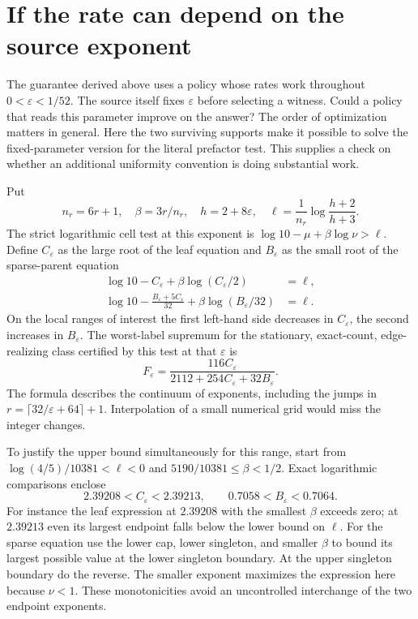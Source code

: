 \section{If the rate can depend on the source exponent}
The guarantee derived above uses a policy whose rates work throughout \(0<\varepsilon<1/52\). The source itself fixes \(\varepsilon\) before selecting a witness. Could a policy that reads this parameter improve on the answer? The order of optimization matters in general. Here the two surviving supports make it possible to solve the fixed-parameter version for the literal prefactor test. This supplies a check on whether an additional uniformity convention is doing substantial work.

Put
\[
 n_r=6r+1,\quad \beta=3r/n_r,\quad
 h=2+8\varepsilon,\quad \ell=\frac{1}{n_r}\log\frac{h+2}{h+3}.
\]
The strict logarithmic cell test at this exponent is \(\log10-\mu+\beta\log\nu>\ell\). Define \(C_\varepsilon\) as the large root of the leaf equation and \(B_\varepsilon\) as the small root of the sparse-parent equation
\begin{align*}
 \log10-C_\varepsilon+\beta\log(C_\varepsilon/2)&=\ell,\\
 \log10-\frac{B_\varepsilon+5C_\varepsilon}{32}
                           +\beta\log(B_\varepsilon/32)&=\ell .
\end{align*}
On the local ranges of interest the first left-hand side decreases in \(C_\varepsilon\), the second increases in \(B_\varepsilon\). The worst-label supremum for the stationary, exact-count, edge-realizing class certified by this test at that \(\varepsilon\) is
\[
 F_\varepsilon=
 \frac{116C_\varepsilon}{2112+254C_\varepsilon+32B_\varepsilon}.       \tag{X}
\]
The formula describes the continuum of exponents, including the jumps in \(r=\lceil32/\varepsilon+64\rceil+1\). Interpolation of a small numerical grid would miss the integer changes.

To justify the upper bound simultaneously for this range, start from
\(\log(4/5)/10381<\ell<0\) and \(5190/10381\le\beta<1/2\). Exact logarithmic comparisons enclose
\[
 2.39208<C_\varepsilon<2.39213,\qquad
 0.7058<B_\varepsilon<0.7064 .
\]
For instance the leaf expression at \(2.39208\) with the smallest \(\beta\) exceeds zero; at \(2.39213\) even its largest endpoint falls below the lower bound on \(\ell\). For the sparse equation use the lower cap, lower singleton, and smaller \(\beta\) to bound its largest possible value at the lower singleton boundary. At the upper singleton boundary do the reverse. The smaller exponent maximizes the expression here because \(\nu<1\). These monotonicities avoid an uncontrolled interchange of the two endpoint exponents.

